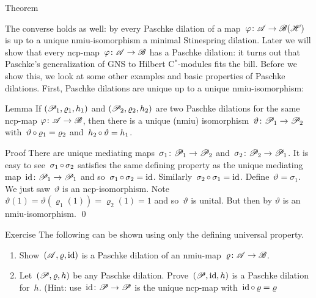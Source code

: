 \documentclass[b]{subfiles}
\begin{document}
\begin{parsec}
\begin{point}{Theorem}
\begin{point}%
The converse holds as well:
    by 
    every Paschke dilation of a map~$\varphi \colon \mathscr{A} \to \mathscr{B}(\mathscr{H})$
    is up to a unique nmiu-isomorphism a minimal Stinespring dilation.
Later we will show that
    every ncp-map~$\varphi\colon \mathscr{A} \to \mathscr{B}$
    has a Paschke dilation:
    it turns out that Paschke's generalization of
    GNS to Hilbert C$^*$-modules fits the bill.
Before we show this,
    we look at some other examples and basic properties
        of Paschke dilations.
First, Paschke dilations are unique up to a unique nmiu-isomorphism:
\par
\end{point}
\end{point}
\begin{point}{Lemma}%
If $(\mathscr{P}_1, \varrho_1, h_1)$
and $(\mathscr{P}_2, \varrho_2, h_2)$
    are two Paschke dilations for 
    the same ncp-map $\varphi\colon \mathscr{A} \to \mathscr{B}$,
    then there is a unique (nmiu)
    isomorphism~$\vartheta \colon \mathscr{P}_1 \to \mathscr{P}_2$
    with~$\vartheta \mathop{\circ} \varrho_1 = \varrho_2$
    and~$h_2 \mathop{\circ} \vartheta = h_1$.
\begin{point}{Proof}%
There are unique mediating maps~$\sigma_1\colon \mathscr{P}_1 \to \mathscr{P}_2$
and~$\sigma_2 \colon \mathscr{P}_2 \to \mathscr{P}_1$.
It is easy to see~$\sigma_1 \mathop{\circ} \sigma_2$
satisfies the same defining property
as the unique mediating map~$\operatorname{id}\colon \mathscr{P}_1 \to \mathscr{P}_1$
and so~$\sigma_1 \mathop{\circ} \sigma_2 = \operatorname{id}$.
Similarly~$\sigma_2 \mathop{\circ} \sigma_1 = \operatorname{id}$.
Define~$\vartheta = \sigma_1$.
We just saw~$\vartheta$ is an ncp-isomorphism.
Note~$\vartheta(1) = \vartheta(\varrho_1(1)) = \varrho_2(1) = 1$
and so~$\vartheta$ is unital.
But then by \TODO{} $\vartheta$ is an nmiu-isomorphism. \qed
\par
\end{point}
\end{point}
\begin{point}{Exercise}%
The following can be shown using only the defining universal property.
\begin{enumerate}
\item
Show~$(\mathscr{A},\varrho,\operatorname{id})$ is a Paschke dilation of
    an nmiu-map~$\varrho\colon \mathscr{A} \to \mathscr{B}$.
\item
Let~$(\mathscr{P}, \varrho, h)$ be any Paschke dilation.
Prove~$(\mathscr{P}, \operatorname{id}, h)$ is a Paschke dilation for~$h$.
(Hint: use~$\operatorname{id}\colon \mathscr{P} \to \mathscr{P}$
is the unique ncp-map with~$\operatorname{id} \mathop{\circ} \varrho = \varrho$

\end{enumerate}
\end{point}
\end{parsec}
\end{document}
